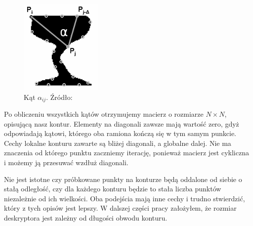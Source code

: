 \begin{figure}[h!] \centering
  \includegraphics[]{images/alpha.png}
  \caption{ Kąt $\alpha_{ij}$. Źródło: \cite{ismatch} } \end{figure}

Po obliczeniu wszystkich kątów otrzymujemy macierz o rozmiarze $N \times N$,
opisującą nasz kontur. Elementy na diagonali zawsze mają wartość zero, gdyż
odpowiadają kątowi, którego oba ramiona kończą się w tym samym punkcie. Cechy
lokalne konturu zawarte są bliżej diagonali, a globalne dalej. Nie ma znaczenia
od którego punktu zaczniemy iterację, ponieważ macierz jest cykliczna i możemy
ją przesuwać wzdłuż diagonali.

Nie jest istotne czy próbkowane punkty na konturze będą oddalone od siebie o
stałą odległość, czy dla każdego konturu będzie to stała liczba punktów
niezależnie od ich wielkości. Oba podejścia mają inne cechy i trudno
stwierdzić, który z tych opisów jest lepszy. W dalszej części pracy założyłem,
że rozmiar deskryptora jest zależny od długości obwodu konturu.


